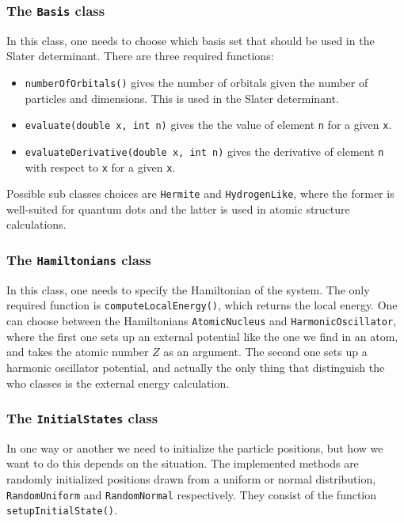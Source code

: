\subsubsection{The \texttt{Basis} class}
In this class, one needs to choose which basis set that should be used in the Slater determinant. There are three required functions:
\begin{itemize}
	\item \texttt{numberOfOrbitals()} gives the number of orbitals given the number of particles and dimensions. This is used in the Slater determinant.
	
	\item \texttt{evaluate(double x, int n)} gives the the value of element \texttt{n} for a given \texttt{x}. 
	
	\item \texttt{evaluateDerivative(double x, int n)} gives the derivative of element \texttt{n} with respect to \texttt{x} for a given \texttt{x}.  
\end{itemize}

Possible sub classes choices are \texttt{Hermite} and \texttt{HydrogenLike}, where the former is well-suited for quantum dots and the latter is used in atomic structure calculations. 

\subsubsection{The \texttt{Hamiltonians} class}
In this class, one needs to specify the Hamiltonian of the system. The only required function is \texttt{computeLocalEnergy()}, which returns the local energy. One can choose between the Hamiltonians \texttt{AtomicNucleus} and \texttt{HarmonicOscillator}, where the first one sets up an external potential like the one we find in an atom, and takes the atomic number $Z$ as an argument. The second one sets up a harmonic oscillator potential, and actually the only thing that distinguish the who classes is the external energy calculation. 

\subsubsection{The \texttt{InitialStates} class}
In one way or another we need to initialize the particle positions, but how we want to do this depends on the situation. The implemented methods are randomly initialized positions drawn from a uniform or normal distribution, \texttt{RandomUniform} and \texttt{RandomNormal} respectively. They consist of the function \texttt{setupInitialState()}.

